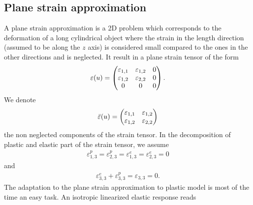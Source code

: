 \documentclass[a4paper,11pt,english]{sphinxmanual}
\begin{document}
\subsection{Plane strain approximation}
\label{\detokenize{userdoc/model_plasticity_small_strain:plane-strain-approximation}}
A plane strain approximation is a 2D problem which corresponds to the deformation of a long cylindrical object where the strain in the length direction (assumed to be along the \(z\) axis) is considered small compared to the ones in the other directions and is neglected. It result in a plane strain tensor of the form
\begin{equation*}
\begin{split}\varepsilon(u) = \left(\hspace{-0.5em}\begin{array}{ccc} \varepsilon_{1,1} & \varepsilon_{1,2} & 0 \\ \varepsilon_{1,2} & \varepsilon_{2,2} & 0 \\ 0 & 0 & 0 \end{array}\hspace{-0.5em}\right).\end{split}
\end{equation*}
We denote
\begin{equation*}
\begin{split}\bar{\varepsilon}(u) =  \left(\hspace{-0.5em}\begin{array}{cc} \varepsilon_{1,1} & \varepsilon_{1,2} \\ \varepsilon_{1,2} & \varepsilon_{2,2} \end{array}\hspace{-0.5em}\right)\end{split}
\end{equation*}
the non neglected components of the strain tensor.
In the decomposition of plastic and elastic part of the strain tensor, we assume
\begin{equation*}
\begin{split}\varepsilon^p_{1,3} = \varepsilon^p_{2,3} = \varepsilon^e_{1,3} = \varepsilon^e_{2,3} = 0\end{split}
\end{equation*}
and
\begin{equation*}
\begin{split}\varepsilon^e_{3,3} + \varepsilon^p_{3,3} = \varepsilon_{3,3} = 0.\end{split}
\end{equation*}
The adaptation to the plane strain approximation to plastic model is most of the time an  easy task. An isotropic linearized elastic response reads
\end{document}
